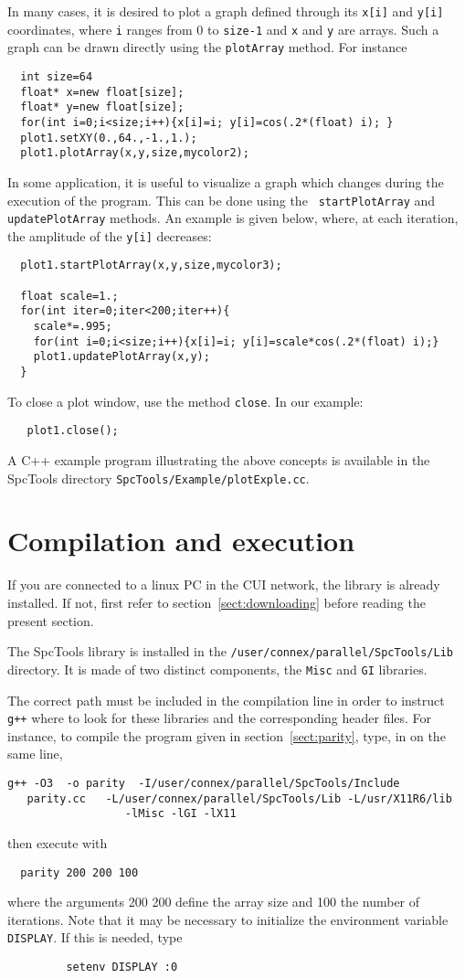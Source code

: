 \documentclass[12pt,a4paper]{article}
\begin{document}
In many cases, it is desired to plot a graph defined through its {\tt x[i]} and {\tt y[i]}
coordinates, where {\tt i} ranges from 0 to {\tt size-1} and {\tt x} and {\tt y} are arrays.
Such a graph can be drawn directly using the {\tt plotArray} method. For instance
\begin{verbatim}
  int size=64
  float* x=new float[size];
  float* y=new float[size];
  for(int i=0;i<size;i++){x[i]=i; y[i]=cos(.2*(float) i); }
  plot1.setXY(0.,64.,-1.,1.);
  plot1.plotArray(x,y,size,mycolor2);
\end{verbatim}
In some application, it is useful to visualize a graph which changes
during the execution of the program. This can be done using the {\tt
startPlotArray} and {\tt updatePlotArray} methods. An example is given below,
where, at each iteration, the amplitude of the {\tt y[i]} decreases:
\begin{verbatim}
  plot1.startPlotArray(x,y,size,mycolor3);

  float scale=1.;
  for(int iter=0;iter<200;iter++){
    scale*=.995;
    for(int i=0;i<size;i++){x[i]=i; y[i]=scale*cos(.2*(float) i);}
    plot1.updatePlotArray(x,y);
  }
\end{verbatim}
To close a plot window, use the method {\tt close}. In our example:
\begin{verbatim}
   plot1.close();
\end{verbatim}

A C++ example program illustrating the above concepts is available in
the SpcTools directory {\tt SpcTools/Example/plotExple.cc}.

\section{Compilation and execution}\label{sect:compil}

If you are connected to a linux PC in the CUI network, the library is already installed.
If not, first refer to section~\ref{sect:downloading} before reading the present section.

The SpcTools library is installed in the {\tt /user/connex/parallel/SpcTools/Lib} directory.
It is made of two distinct components, the {\tt Misc} and {\tt GI} libraries.

The correct path must be included in the compilation line in order to instruct {\tt g++} where
to look for these libraries and the corresponding header files. For instance, to compile
the program given in section~\ref{sect:parity}, type, in on the same line,
\begin{verbatim}
g++ -O3  -o parity  -I/user/connex/parallel/SpcTools/Include 
   parity.cc   -L/user/connex/parallel/SpcTools/Lib -L/usr/X11R6/lib 
                  -lMisc -lGI -lX11
\end{verbatim}
then execute with 
\begin{verbatim} 
  parity 200 200 100
\end{verbatim}
where the arguments 200 200 define the
array size and 100 the number of iterations. Note that it may be
necessary to initialize the environment variable {\tt DISPLAY}. If this is needed, type 
\begin{verbatim}
         setenv DISPLAY :0
\end{verbatim}
\end{document}
